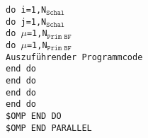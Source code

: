 \texttt{do i=1,N$_{\texttt{Schal}}$}\\ 
\null\quad\texttt{do j=1,N$_{\texttt{Schal}}$}\\ 
\null\quad\quad\texttt{do $\mu$=1,N$_{\texttt{Prim BF}}$}\\ 
\null\quad\quad\quad\texttt{do $\mu$=1,N$_{\texttt{Prim BF}}$}\\
\null\quad\quad\quad\quad \texttt{Auszuführender Programmcode}\\ 
\null\quad\quad\quad\texttt{end do}\\ 
\null\quad\quad\texttt{end do}\\ 
\null\quad\texttt{end do}\\ 
\texttt{end do}\\
\texttt{\$OMP END DO}\\
\texttt{\$OMP END PARALLEL}\\
\\
